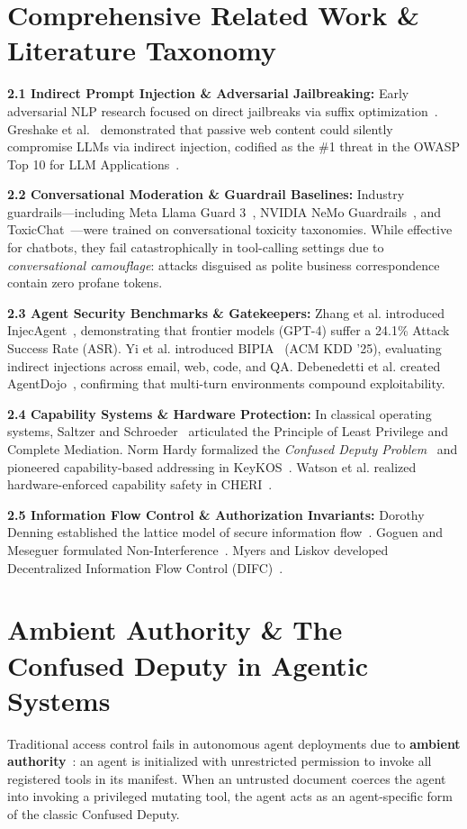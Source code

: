 \documentclass[10pt,journal,compsoc]{IEEEtran}
\begin{document}
\section{Comprehensive Related Work \& Literature Taxonomy}
\textbf{2.1 Indirect Prompt Injection \& Adversarial Jailbreaking:} Early adversarial NLP research focused on direct jailbreaks via suffix optimization~\cite{ref_20, ref_38}. Greshake et al.~\cite{ref_34} demonstrated that passive web content could silently compromise LLMs via indirect injection, codified as the \#1 threat in the OWASP Top 10 for LLM Applications~\cite{ref_30}.

\textbf{2.2 Conversational Moderation \& Guardrail Baselines:} Industry guardrails---including Meta Llama Guard 3~\cite{ref_7}, NVIDIA NeMo Guardrails~\cite{ref_8}, and ToxicChat~\cite{ref_17}---were trained on conversational toxicity taxonomies. While effective for chatbots, they fail catastrophically in tool-calling settings due to \textit{conversational camouflage}: attacks disguised as polite business correspondence contain zero profane tokens.

\textbf{2.3 Agent Security Benchmarks \& Gatekeepers:} Zhang et al. introduced InjecAgent~\cite{ref_5}, demonstrating that frontier models (GPT-4) suffer a 24.1\% Attack Success Rate (ASR). Yi et al. introduced BIPIA~\cite{ref_4} (ACM KDD '25), evaluating indirect injections across email, web, code, and QA. Debenedetti et al. created AgentDojo~\cite{ref_26}, confirming that multi-turn environments compound exploitability.

\textbf{2.4 Capability Systems \& Hardware Protection:} In classical operating systems, Saltzer and Schroeder~\cite{ref_9} articulated the Principle of Least Privilege and Complete Mediation. Norm Hardy formalized the \textit{Confused Deputy Problem}~\cite{ref_6} and pioneered capability-based addressing in KeyKOS~\cite{ref_10}. Watson et al. realized hardware-enforced capability safety in CHERI~\cite{ref_33}.

\textbf{2.5 Information Flow Control \& Authorization Invariants:} Dorothy Denning established the lattice model of secure information flow~\cite{ref_19}. Goguen and Meseguer formulated Non-Interference~\cite{ref_25}. Myers and Liskov developed Decentralized Information Flow Control (DIFC)~\cite{ref_32}.

\section{Ambient Authority \& The Confused Deputy in Agentic Systems}
Traditional access control fails in autonomous agent deployments due to \textbf{ambient authority}~\cite{ref_6}: an agent is initialized with unrestricted permission to invoke all registered tools in its manifest. When an untrusted document coerces the agent into invoking a privileged mutating tool, the agent acts as an agent-specific form of the classic Confused Deputy.
\end{document}
